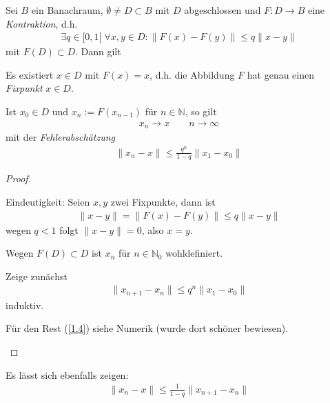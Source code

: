 \begin{theorem} \label{1.3}
	Sei $B$ ein Banachraum, $\emptyset \neq D \subset B$ mit $D$ abgeschlossen und $F: D \to B$ eine \emph{Kontraktion}, d.h.
	\begin{align*}
		\exists q \in [0,1[ \; \forall x,y \in D : \|F(x) - F(y)\| \le q\|x-y\|
	\end{align*}
	mit $F(D) \subset D$. Dann gilt
	\begin{enum-arab}
		\item
			Es existiert $x\in D$ mit $F(x)=x$, d.h. die Abbildung $F$ hat genau einen \emph{Fixpunkt} $x\in D$.
		\item
			Ist $x_0 \in D$ und $x_n := F(x_{n-1})$ für $n\in \mathbb{N}$, so gilt
			\begin{align*}
				x_n \to x \qquad n \to \infty
			\end{align*}
			mit der \emph{Fehlerabschätzung}
			\begin{align*}
				\|x_n - x\| \le \frac{q^n}{1-q} \|x_1 - x_0\|
			\end{align*}
	\end{enum-arab}
	\begin{proof}
		\begin{enum-arab}
			\item
				Eindeutigkeit: Seien $x,y$ zwei Fixpunkte, dann ist
				\begin{align*}
					\|x-y\| = \|F(x) - F(y)\| \le q \|x-y\|
				\end{align*}
				wegen $q < 1$ folgt $\|x-y\| = 0$, also $x=y$.
			\item
				Wegen $F(D) \subset D$ ist $x_n$ für $n\in \mathbb{N}_0$ wohldefiniert.

				Zeige zunächst
				\begin{align*}
					\|x_{n+1} - x_n\| \le q^n \|x_1 - x_0\|
				\end{align*}
				induktiv.

				Für den Rest (\ref{1.4}) siehe Numerik (wurde dort schöner bewiesen).
		\end{enum-arab}
	\end{proof}
\end{theorem}

\begin{notice} \label{1.4}
	Es lässt sich ebenfalls zeigen:
	\begin{align*}
		\|x_n - x\| \le \frac 1{1-q} \|x_{n+1} -x_n \|
	\end{align*}
\end{notice}
